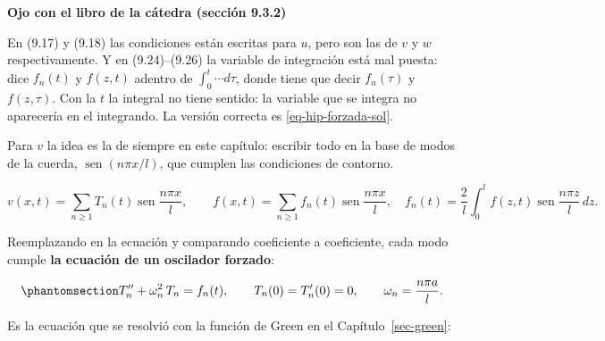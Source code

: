 \documentclass[
  spanish,
  a4paper,
]{scrbook}
\theoremstyle{definition}
\theoremstyle{plain}
\theoremstyle{definition}
\theoremstyle{plain}
\theoremstyle{definition}
\theoremstyle{remark}
\begin{document}
\begin{tcolorbox}[enhanced jigsaw, arc=.35mm, bottomrule=.15mm, breakable, colback=white, colframe=quarto-callout-warning-color-frame, left=2mm, leftrule=.75mm, opacityback=0, rightrule=.15mm, toprule=.15mm]
\begin{minipage}[t]{5.5mm}
\textcolor{quarto-callout-warning-color}{\faExclamationTriangle}
\end{minipage}%
\begin{minipage}[t]{\textwidth - 5.5mm}

\vspace{-3mm}\textbf{Ojo con el libro de la cátedra (sección 9.3.2)}\vspace{3mm}

En (9.17) y (9.18) las condiciones están escritas para \(u\), pero son
las de \(v\) y \(w\) respectivamente. Y en (9.24)--(9.26) la variable de
integración está mal puesta: dice \(f_n(t)\) y \(f(z,t)\) adentro de
\(\int_0^t\cdots d\tau\), donde tiene que decir \(f_n(\tau)\) y
\(f(z,\tau)\). Con la \(t\) la integral no tiene sentido: la variable
que se integra no aparecería en el integrando. La versión correcta es
\ref{eq-hip-forzada-sol}.

\end{minipage}%
\end{tcolorbox}

Para \(v\) la idea es la de siempre en este capítulo: escribir todo en
la base de modos de la cuerda, \(\operatorname{sen}(n\pi x/l)\), que
cumplen las condiciones de contorno.

\[
v(x,t) = \sum_{n\ge1} T_n(t)\operatorname{sen}\frac{n\pi x}{l}, \qquad
f(x,t) = \sum_{n\ge1} f_n(t)\operatorname{sen}\frac{n\pi x}{l}, \quad
f_n(t) = \frac2l\int_0^l f(z,t)\operatorname{sen}\frac{n\pi z}{l}\,dz .
\]

Reemplazando en la ecuación y comparando coeficiente a coeficiente, cada
modo cumple \textbf{la ecuación de un oscilador forzado}:

\begin{equation}\protect\phantomsection\label{eq-hip-oscilador}{
T_n'' + \omega_n^2\,T_n = f_n(t), \qquad T_n(0) = T_n'(0) = 0, \qquad \omega_n = \frac{n\pi a}{l}.
}\end{equation}

Es la ecuación que se resolvió con la función de Green en el
Capítulo~\ref{sec-green}:
\end{document}
